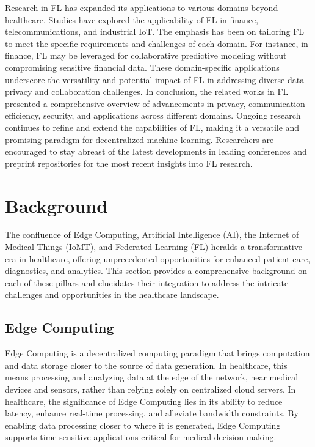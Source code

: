 \documentclass[conference]{IEEEtran}
\begin{document}

Research in FL has expanded its applications to various domains beyond healthcare. Studies have explored the applicability of FL in finance, telecommunications, and industrial IoT. The emphasis has been on tailoring FL to meet the specific requirements and challenges of each domain. For instance, in finance, FL may be leveraged for collaborative predictive modeling without compromising sensitive financial data. These domain-specific applications underscore the versatility and potential impact of FL in addressing diverse data privacy\cite{8} and collaboration challenges. In conclusion, the related works in FL presented a comprehensive overview of advancements in privacy, communication efficiency, security, and applications across different domains. Ongoing research continues to refine and extend the capabilities of FL, making it a versatile and promising paradigm for decentralized machine learning. Researchers are encouraged to stay abreast of the latest developments in leading conferences and preprint repositories for the most recent insights into FL research.

\section{Background}

The confluence of Edge Computing, Artificial Intelligence (AI), the Internet of Medical Things (IoMT), and Federated Learning (FL) heralds a transformative era in healthcare, offering unprecedented opportunities for enhanced patient care, diagnostics, and analytics. This section provides a comprehensive background on each of these pillars and elucidates their integration to address the intricate challenges and opportunities in the healthcare landscape.

\subsection{Edge Computing}

Edge Computing is a decentralized computing paradigm that brings computation and data storage closer to the source of data generation. In healthcare, this means processing and analyzing data at the edge of the network\cite{2}, near medical devices and sensors, rather than relying solely on centralized cloud servers. In healthcare, the significance of Edge Computing lies in its ability to reduce latency, enhance real-time processing, and alleviate bandwidth constraints. By enabling data processing closer to where it is generated, Edge Computing supports time-sensitive applications critical for medical decision-making.
\end{document}
